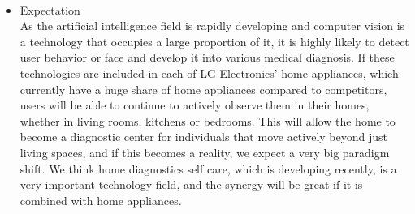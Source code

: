 \\
\begin{itemize}
    \item Expectation \\
    As the artificial intelligence field is rapidly developing and computer vision is a technology that occupies a large proportion of it, it is highly likely to detect user behavior or face and develop it into various medical diagnosis.
If these technologies are included in each of LG Electronics' home appliances, which currently have a huge share of home appliances compared to competitors, users will be able to continue to actively observe them in their homes, whether in living rooms, kitchens or bedrooms.
This will allow the home to become a diagnostic center for individuals that move actively beyond just living spaces, and if this becomes a reality, we expect a very big paradigm shift.
\cite{r14}We think home diagnostics self care, which is developing recently, is a very important technology field, and the synergy will be great if it is combined with home appliances.
\end{itemize}

